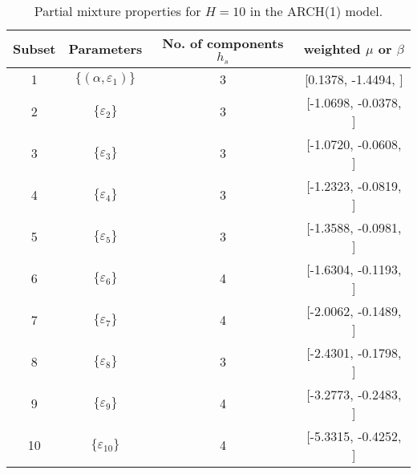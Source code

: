 \begin{table}[h] 
\centering 
\caption{Partial mixture properties for $H=10$ in the ARCH(1) model.} 
\label{tab:pmits_arch} 
\begin{tabular}{cccc}  
 Subset & Parameters& No. of components $h_{s}$ & weighted $\mu$ or $\beta$  \\ \hline 
1 & $\{(\alpha,\varepsilon_{1})\}$ & 3 & [0.1378, -1.4494, ]   \\ [1ex] 
2 & $\{\varepsilon_{2}\}$ & 3 & [-1.0698, -0.0378, ]   \\ [1ex] 
3 & $\{\varepsilon_{3}\}$ & 3 & [-1.0720, -0.0608, ]   \\ [1ex] 
4 & $\{\varepsilon_{4}\}$ & 3 & [-1.2323, -0.0819, ]   \\ [1ex] 
5 & $\{\varepsilon_{5}\}$ & 3 & [-1.3588, -0.0981, ]   \\ [1ex] 
6 & $\{\varepsilon_{6}\}$ & 4 & [-1.6304, -0.1193, ]   \\ [1ex] 
7 & $\{\varepsilon_{7}\}$ & 4 & [-2.0062, -0.1489, ]   \\ [1ex] 
8 & $\{\varepsilon_{8}\}$ & 3 & [-2.4301, -0.1798, ]   \\ [1ex] 
9 & $\{\varepsilon_{9}\}$ & 4 & [-3.2773, -0.2483, ]   \\ [1ex] 
10 & $\{\varepsilon_{10}\}$ & 4 & [-5.3315, -0.4252, ]   \\ [1ex] 
\hline 
\end{tabular} 
\end{table} 
